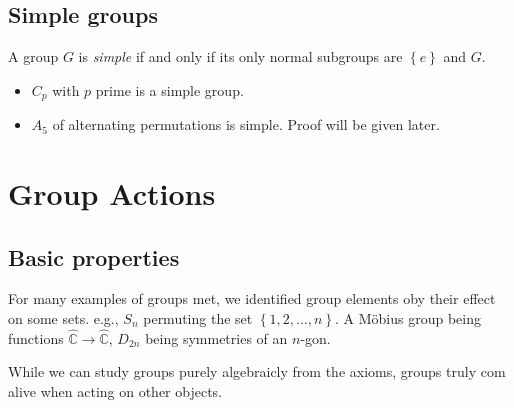 \documentclass[a4paper]{article}
\begin{document}
\subsection{Simple groups}
\begin{definition}
  A group $G$ is \textit{simple} if and only if its only normal
  subgroups are $ \left\{ e\right\} $ and $G$.
\end{definition}
\begin{example}
  \begin{itemize}
    \item $ C_p $ with $p$ prime is a simple group.
    \item $ A_5 $ of alternating permutations is simple. Proof will
      be given later.
  \end{itemize}
\end{example}
\section{Group Actions}
\subsection{Basic properties}
For many examples of groups met, we identified group elements oby
their effect on some sets. e.g., $S_n$ permuting the set $ \left\{
1,2,\dots,n\right\} $. A M\"{o}bius group being functions $
\hat{\mathbb{C}}\to \hat{\mathbb{C}} $, $ D_{2n} $ being symmetries
of an $n$-gon.

While we can study groups purely algebraicly from the axioms, groups
truly com alive when acting on other objects.
\end{document}
